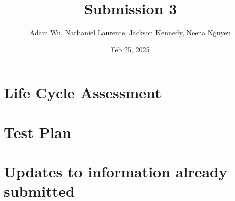 \documentclass{article}
\title{Submission 3}
\author{Adam Wu, Nathaniel Laurente, Jackson Kennedy, Neena Nguyen}
\date{Feb 25, 2025}
\begin{document}
\maketitle
\tableofcontents
\newpage





\section{Life Cycle Assessment}
\section{Test Plan}
\section{Updates to information already submitted}
\end{document}
